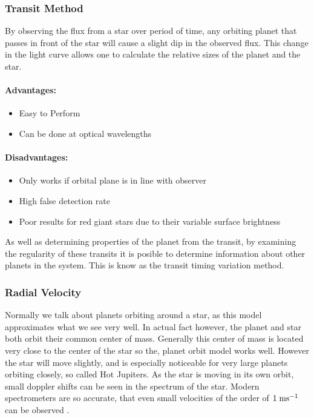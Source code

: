 \subsubsection{Transit Method}

By observing the flux from a star over period of time, any orbiting planet that passes in front of the star will cause a slight dip in the observed flux. This change in the light curve allows one to calculate the relative sizes of the planet and the star.

\paragraph{Advantages:}
\begin{itemize}
    \item Easy to Perform
    \item Can be done at optical wavelengths
\end{itemize}

\paragraph{Disadvantages:}
\begin{itemize}
    \item Only works if orbital plane is in line with observer
    \item High false detection rate \parencite{santerne2012sophie}
    \item Poor results for red giant stars due to their variable surface brightness
\end{itemize}

As well as determining properties of the planet from the transit, by examining the regularity of these transits it is posible to determine information about other planets in the system. This is know as the transit timing variation method.

\subsubsection{Radial Velocity}

Normally we talk about planets orbiting around a star, as this model approximates what we see very well. In actual fact however, the planet and star both orbit their common center of mass. Generally this center of mass is located very close to the center of the star so the, planet orbit model works well. However the star will move slightly, and is especially noticeable for very large planets orbiting closely, so called Hot Jupiters. As the star is moving in its own orbit, small doppler shifts can be seen in the spectrum of the star. Modern spectrometers are so accurate, that even small velocities of the order of $1\;\mathrm{ms^{-1}}$ can be observed \parencite{ge2002externally}.


